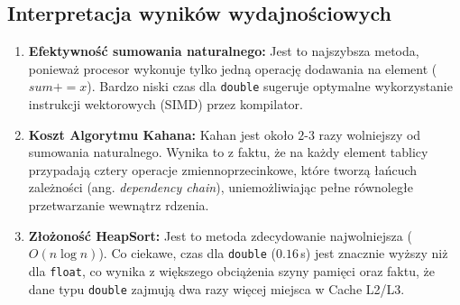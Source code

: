 \documentclass{article}
\begin{document}
\subsection{Interpretacja wyników wydajnościowych}
\begin{enumerate}
    \item \textbf{Efektywność sumowania naturalnego:} Jest to najszybsza metoda, ponieważ procesor wykonuje tylko jedną operację dodawania na element ($sum += x$). Bardzo niski czas dla \texttt{double} sugeruje optymalne wykorzystanie instrukcji wektorowych (SIMD) przez kompilator.
    \item \textbf{Koszt Algorytmu Kahana:} Kahan jest około $2$-$3$ razy wolniejszy od sumowania naturalnego. Wynika to z faktu, że na każdy element tablicy przypadają cztery operacje zmiennoprzecinkowe, które tworzą łańcuch zależności (ang. \textit{dependency chain}), uniemożliwiając pełne równoległe przetwarzanie wewnątrz rdzenia.
    \item \textbf{Złożoność HeapSort:} Jest to metoda zdecydowanie najwolniejsza ($O(n \log n)$). Co ciekawe, czas dla \texttt{double} ($0.16$\,s) jest znacznie wyższy niż dla \texttt{float}, co wynika z większego obciążenia szyny pamięci oraz faktu, że dane typu \texttt{double} zajmują dwa razy więcej miejsca w Cache L2/L3.
\end{enumerate}
\end{document}
